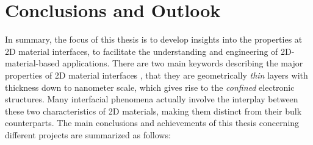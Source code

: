 \chapter{Conclusions and Outlook}
\label{ch:outlook}



\vspace{1em}

In summary, the focus of this thesis is to develop insights into the
properties at 2D material interfaces, to facilitate the understanding
and engineering of 2D-material-based applications.
%
There are two main keywords describing the major properties of 2D
material interfaces , that they are geometrically \textit{thin} layers
with thickness down to nano\-meter scale, which gives rise to the
\textit{confined} electronic structures. Many interfacial phenomena
actually involve the interplay between these two characteristics of 2D
materials, making them distinct from their bulk counterparts. The main
conclusions and achievements of this thesis concerning different
projects are summarized as follows:
